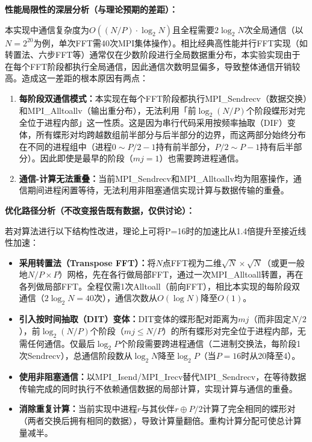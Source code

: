 \documentclass{SYSUReport}
\begin{document}
\textbf{性能局限性的深层分析（与理论预期的差距）：}

本实现中通信复杂度为$O((N/P) \cdot \log_2 N)$且全程需要$2 \log_2 N$次全局通信（以$N=2^{20}$为例，单次FFT需40次MPI集体操作）。相比经典高性能并行FFT实现（如转置法、六步FFT等）通常仅在少数阶段进行全局数据重分布，本实验实现由于在每个FFT阶段都执行全局通信，因此通信次数明显偏多，导致整体通信开销较高。造成这一差距的根本原因有两点：

\begin{enumerate}
    \item \textbf{每阶段双通信模式：}本实现在每个FFT阶段都执行MPI\_Sendrecv（数据交换）和MPI\_Alltoallv（输出重分布），无法利用「前$\log_2(N/P)$个阶段蝶形对完全位于进程内部」这一性质。这是因为串行代码采用按频率抽取（DIF）变体，所有蝶形对均跨越数组前半部分与后半部分的边界，而这两部分始终分布在不同的进程组中（进程$0\sim P/2-1$持有前半部分，$P/2\sim P-1$持有后半部分）。因此即使是最早的阶段（$mj=1$）也需要跨进程通信。
    \item \textbf{通信-计算无法重叠：}当前MPI\_Sendrecv和MPI\_Alltoallv均为阻塞操作，通信期间进程闲置等待，无法利用非阻塞通信实现计算与数据传输的重叠。
\end{enumerate}

\textbf{优化路径分析（不改变报告既有数据，仅供讨论）：}

若对算法进行以下结构性改进，理论上可将P=16时的加速比从1.4倍提升至接近线性加速：

\begin{itemize}
    \item \textbf{采用转置法（Transpose FFT）：}将$N$点FFT视为二维$\sqrt{N} \times \sqrt{N}$（或更一般地$N/P \times P$）网格，先在各行做局部FFT，通过一次MPI\_Alltoall转置，再在各列做局部FFT。全程仅需1次Alltoall（前向FFT），相比本实现的每阶段双通信（$2 \log_2 N = 40$次），通信次数从$O(\log N)$降至$O(1)$。
    \item \textbf{引入按时间抽取（DIT）变体：}DIT变体的蝶形配对距离为$mj$（而非固定$N/2$），前$\log_2(N/P)$个阶段（$mj \leq N/P$）的所有蝶形对完全位于进程内部，无需任何通信。仅最后$\log_2 P$个阶段需要跨进程通信（二进制交换法，每阶段1次Sendrecv），总通信阶段数从$\log_2 N$降至$\log_2 P$（当$P=16$时从20降至4）。
    \item \textbf{使用非阻塞通信：}以MPI\_Isend/MPI\_Irecv替代MPI\_Sendrecv，在等待数据传输完成的同时执行不依赖通信数据的局部计算，实现计算与通信的重叠。
    \item \textbf{消除重复计算：}当前实现中进程$r$与其伙伴$r \oplus P/2$计算了完全相同的蝶形对（两者交换后拥有相同的数据），导致计算量翻倍。重构计算分配可使总计算量减半。
\end{itemize}
\end{document}
